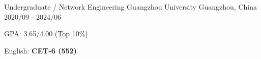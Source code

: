 

\begin{cventries}

  \cventry
  {Undergraduate / Network Engineering} %
  {Guangzhou University} %
  {Guangzhou, China} %
  {2020/09 - 2024/06} %
  {
    \begin{cvitems} %
      \item {GPA: 3.65/4.00 (Top 10\%)}
      \item {English: \textbf{CET-6 (552)}}
    \end{cvitems}
  }

\end{cventries}
